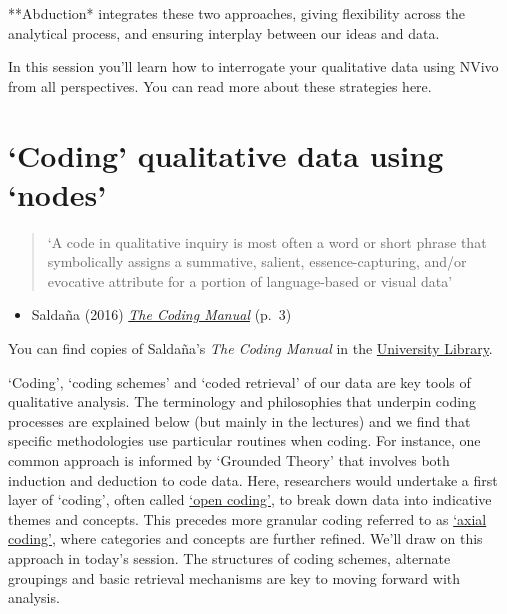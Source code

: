 \documentclass[
]{book}
\providecommand{\tightlist}{%
  \setlength{\itemsep}{0pt}\setlength{\parskip}{0pt}}
\begin{document}
**Abduction* integrates these two approaches, giving flexibility across the analytical process, and ensuring interplay between our ideas and data.

In this session you'll learn how to interrogate your qualitative data using NVivo from all perspectives. You can read more about these strategies here.

\hypertarget{coding-qualitative-data-using-nodes}{%
\section{`Coding' qualitative data using `nodes'}\label{coding-qualitative-data-using-nodes}}

\begin{quote}
`A code in qualitative inquiry is most often a word or short phrase that symbolically assigns a summative, salient, essence-capturing, and/or evocative attribute for a portion of language-based or visual data'
\end{quote}

\begin{itemize}
\tightlist
\item
  Saldaña (2016) \href{https://uk.sagepub.com/en-gb/eur/the-coding-manual-for-qualitative-researchers/book243616}{\emph{The Coding Manual}} (p.~3)
\end{itemize}

You can find copies of Saldaña's \emph{The Coding Manual} in the \href{https://www.librarysearch.manchester.ac.uk/permalink/44MAN_INST/1r887gn/alma992975869959501631}{University Library}.

`Coding', `coding schemes' and `coded retrieval' of our data are key tools of qualitative analysis. The terminology and philosophies that underpin coding processes are explained below (but mainly in the lectures) and we find that specific methodologies use particular routines when coding. For instance, one common approach is informed by `Grounded Theory' that involves both induction and deduction to code data. Here, researchers would undertake a first layer of `coding', often called \href{https://en.wikipedia.org/wiki/Open_coding}{`open coding'}, to break down data into indicative themes and concepts. This precedes more granular coding referred to as \href{https://en.wikipedia.org/wiki/Axial_coding}{`axial coding'}, where categories and concepts are further refined. We'll draw on this approach in today's session. The structures of coding schemes, alternate groupings and basic retrieval mechanisms are key to moving forward with analysis.
\end{document}

